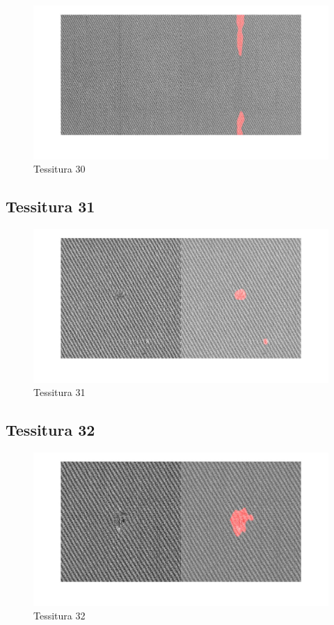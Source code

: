 \documentclass{article}
\begin{document}
\begin{figure}[h!]
	\centering
	\includegraphics[width=\textwidth]{results/res30.jpg}
	\caption{Tessitura 30}
\end{figure}

\newpage
\subsection{Tessitura 31}

\begin{figure}[h!]
	\centering
	\includegraphics[width=\textwidth]{results/res31.jpg}
	\caption{Tessitura 31}
\end{figure}


\subsection{Tessitura 32}

\begin{figure}[h!]
	\centering
	\includegraphics[width=\textwidth]{results/res32.jpg}
	\caption{Tessitura 32}
\end{figure}
\end{document}
